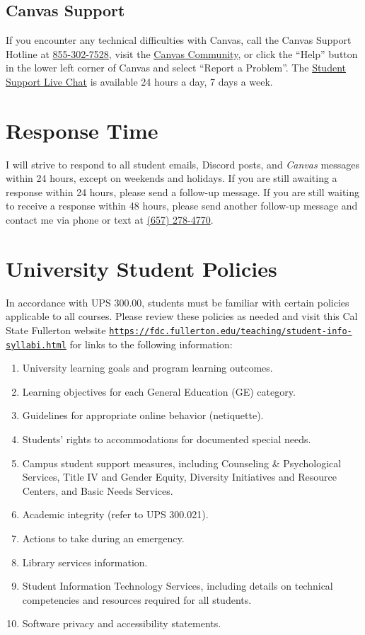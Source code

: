 \documentclass[12pt, letterpaper]{article}
\begin{document}
\subsection*{Canvas Support}

If you encounter any technical difficulties with Canvas, call the Canvas Support Hotline at \href{tel:+18553027528}{855-302-7528}, visit the \href{https://community.canvaslms.com/docs/DOC-10720-67952720329}{Canvas Community}, or click the ``Help'' button in the lower left corner of Canvas and select ``Report a Problem''. The \href{https://cases.canvaslms.com/liveagentchat?chattype=student&sfid=001A000000YzcwQIAR}{Student Support Live Chat} is available 24 hours a day, 7 days a week.

\section*{Response Time} I will strive to respond to all student emails, Discord posts, and \emph{Canvas} messages within 24 hours, except on weekends and holidays. If you are still awaiting a response within 24 hours, please send a follow-up message. If you are still waiting to receive a response within 48 hours, please send another follow-up message and contact me via phone or text at \href{tel:+16572784770}{(657) 278-4770}.

\section{University Student Policies}

In accordance with UPS 300.00, students must be familiar with certain policies applicable to all courses. Please review these policies as needed and visit this Cal State Fullerton website \texttt{\href{https://fdc.fullerton.edu/teaching/student-info-syllabi.html}{https://fdc.fullerton.edu/teaching/student-info-syllabi.html}} for links to the following information:

\begin{enumerate}
    \item   University learning goals and program learning outcomes.
    \item	Learning objectives for each General Education (GE) category.
    \item	Guidelines for appropriate online behavior (netiquette).
    \item	Students’ rights to accommodations for documented special needs.
    \item   Campus student support measures, including Counseling \& Psychological Services, Title IV and Gender Equity, Diversity Initiatives and Resource Centers, and Basic Needs Services.
    \item	Academic integrity (refer to UPS 300.021).
    \item	Actions to take during an emergency.
    \item	Library services information.
    \item	Student Information Technology Services, including details on technical competencies and resources required for all students.
    \item	Software privacy and accessibility statements.
\end{enumerate}
\end{document}
